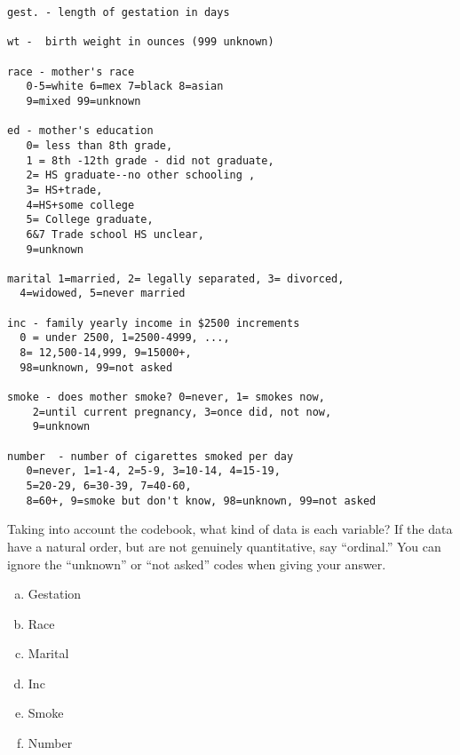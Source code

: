 \begin{verbatim}
gest. - length of gestation in days

wt -  birth weight in ounces (999 unknown)

race - mother's race 
   0-5=white 6=mex 7=black 8=asian 
   9=mixed 99=unknown 

ed - mother's education 
   0= less than 8th grade, 
   1 = 8th -12th grade - did not graduate, 
   2= HS graduate--no other schooling , 
   3= HS+trade,
   4=HS+some college 
   5= College graduate, 
   6&7 Trade school HS unclear, 
   9=unknown 

marital 1=married, 2= legally separated, 3= divorced,
  4=widowed, 5=never married

inc - family yearly income in $2500 increments 
  0 = under 2500, 1=2500-4999, ..., 
  8= 12,500-14,999, 9=15000+,
  98=unknown, 99=not asked

smoke - does mother smoke? 0=never, 1= smokes now, 
    2=until current pregnancy, 3=once did, not now, 
    9=unknown

number  - number of cigarettes smoked per day 
   0=never, 1=1-4, 2=5-9, 3=10-14, 4=15-19, 
   5=20-29, 6=30-39, 7=40-60, 
   8=60+, 9=smoke but don't know, 98=unknown, 99=not asked
\end{verbatim}


Taking into account the codebook, what kind of data is each variable?
If the data have a natural order, but are not genuinely quantitative,
say ``ordinal.''  You can ignore the ``unknown'' or ``not asked''
codes when giving your answer.

\begin{enumerate}[(a)]
\item Gestation  
\item Race  
\item Marital  
\item Inc  
\item Smoke   
\item Number   
\end{enumerate}

